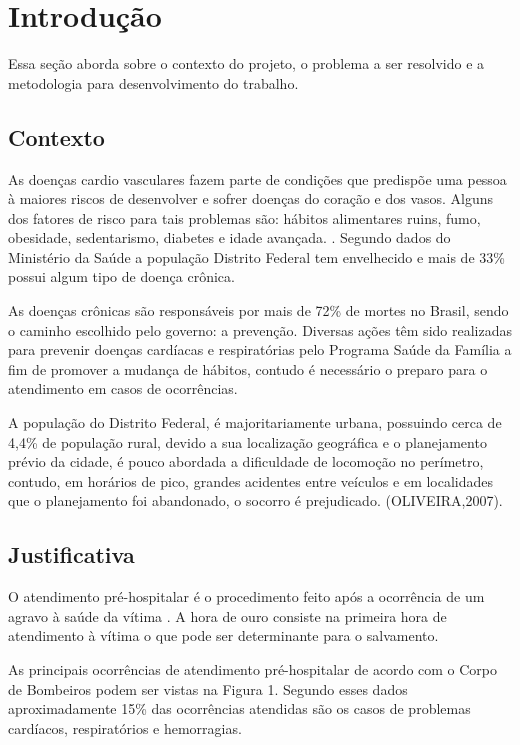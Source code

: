 \chapter[Introdução]{Introdução}\label{cap1}
	Essa seção aborda sobre o contexto do projeto, o problema a ser resolvido e a metodologia para desenvolvimento do trabalho. 
\section{Contexto}

As doenças cardio vasculares fazem parte de condições que predispõe uma pessoa à maiores riscos de desenvolver e sofrer doenças do coração e dos vasos. Alguns dos fatores de risco para tais problemas são: hábitos alimentares ruins, fumo, obesidade, sedentarismo, diabetes e idade avançada. \cite{ceolin}. Segundo dados do Ministério da Saúde a população Distrito Federal tem envelhecido e mais de 33\% possui algum tipo de doença crônica. \cite{portal}

As doenças crônicas são responsáveis por mais de 72\% de mortes no Brasil, sendo o caminho escolhido pelo governo: a prevenção. Diversas ações têm sido realizadas para prevenir doenças cardíacas e respiratórias pelo Programa Saúde da Família a fim de promover a mudança de hábitos, contudo é necessário o preparo para o atendimento em casos de ocorrências.

A população do Distrito Federal, é majoritariamente urbana, possuindo cerca de 4,4\% de população rural, devido a sua localização geográfica e o planejamento prévio da cidade, é pouco abordada a dificuldade de locomoção no perímetro, contudo, em horários de pico, grandes acidentes entre veículos e em localidades que o planejamento foi abandonado, o socorro é prejudicado. (OLIVEIRA,2007).
\section{Justificativa}

O atendimento pré-hospitalar é o procedimento feito após a ocorrência de um agravo à saúde da vítima \cite{SBC}. A hora de ouro consiste na primeira hora de atendimento à vítima o que pode ser determinante para o salvamento.\cite{PQA} 

As principais ocorrências de atendimento pré-hospitalar de acordo com o Corpo de Bombeiros podem ser vistas na Figura 1. Segundo esses dados aproximadamente 15\% das ocorrências atendidas são os casos de problemas cardíacos, respiratórios e hemorragias.

